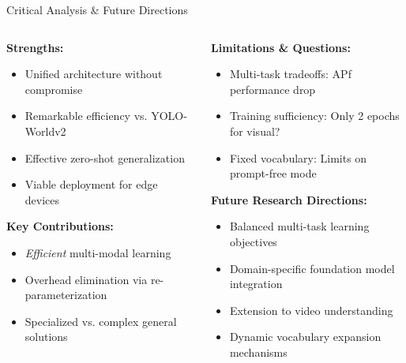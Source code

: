 \documentclass{beamer}
\begin{document}
\begin{frame}{Critical Analysis \& Future Directions}
    \begin{columns}[T]
        \begin{column}{0.48\textwidth}
            \textbf{Strengths:}
            \begin{itemize}\small\setlength{\itemsep}{-1pt}
                \item \textcolor{ubburgundy}{Unified architecture} without compromise
                \item \textcolor{ubburgundy}{Remarkable efficiency} vs. YOLO-Worldv2
                \item Effective zero-shot generalization
                \item Viable deployment for edge devices
            \end{itemize}
            
            \vspace{0.1cm}
            \textbf{Key Contributions:}
            \begin{itemize}\small\setlength{\itemsep}{-1pt}
                \item \textit{Efficient} multi-modal learning
                \item Overhead elimination via re-parameterization
                \item Specialized vs. complex general solutions
            \end{itemize}
        \end{column}
        
        \begin{column}{0.48\textwidth}
            \textbf{Limitations \& Questions:}
            \begin{itemize}\small\setlength{\itemsep}{-1pt}
                \item \textcolor{ubburgundy}{Multi-task tradeoffs}: APf performance drop
                \item \textcolor{ubburgundy}{Training sufficiency}: Only 2 epochs for visual?
                \item \textcolor{ubburgundy}{Fixed vocabulary}: Limits on prompt-free mode
            \end{itemize}
            
            \vspace{0.1cm}
            \textbf{Future Research Directions:}
            \begin{itemize}\small\setlength{\itemsep}{-1pt}
                \item Balanced multi-task learning objectives
                \item Domain-specific foundation model integration
                \item Extension to video understanding
                \item Dynamic vocabulary expansion mechanisms
            \end{itemize}
        \end{column}
    \end{columns}
\end{frame}
\end{document}
